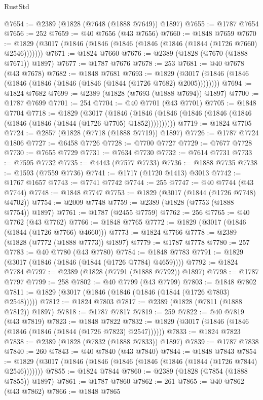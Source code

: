 \begin{lexlean}{RustStd}
\begin{coremodule}
@7654 := @2389 (@1828 (@7648 (@1888 @7649)) @1897)
@7655 := @1787 @7654
@7656 := 252
@7659 := @40 @7656 (@43 @7656)
@7660 := @1848 @7659
@7670 := @1829 (@3017 (@1846 (@1846 (@1846 (@1846 (@1846 (@1844 (@1726 @7660) @2546)))))))
@7671 := @1824 @7660
@7676 := @2389 (@1828 (@7670 (@1888 @7671)) @1897)
@7677 := @1787 @7676
@7678 := 253
@7681 := @40 @7678 (@43 @7678)
@7682 := @1848 @7681
@7693 := @1829 (@3017 (@1846 (@1846 (@1846 (@1846 (@1846 (@1846 (@1844 (@1726 @7682) @2005))))))))
@7694 := @1824 @7682
@7699 := @2389 (@1828 (@7693 (@1888 @7694)) @1897)
@7700 := @1787 @7699
@7701 := 254
@7704 := @40 @7701 (@43 @7701)
@7705 := @1848 @7704
@7718 := @1829
    (@3017
      (@1846 (@1846 (@1846 (@1846 (@1846 (@1846 (@1846 (@1846 (@1844 (@1726 @7705) @1852))))))))))
@7719 := @1824 @7705
@7724 := @2857 (@1828 (@7718 (@1888 @7719)) @1897)
@7726 := @1787 @7724 @1806
@7727 := @6458 @7726
@7728 := @7700 @7727
@7729 := @7677 @7728
@7730 := @7655 @7729
@7731 := @7634 @7730
@7732 := @7614 @7731
@7733 := @7595 @7732
@7735 := @4443 (@7577 @7733)
@7736 := @1888 @7735
@7738 := @1593 (@7559 @7736)
@7741 := @1717 (@1720 @1413) @3013
@7742 := @1767 @1657
@7743 := @7741 @7742
@7744 := 255
@7747 := @40 @7744 (@43 @7744)
@7748 := @1848 @7747
@7753 := @1829 (@3017 (@1844 (@1726 @7748) @4702))
@7754 := @2009 @7748
@7759 := @2389 (@1828 (@7753 (@1888 @7754)) @1897)
@7761 := @1787 (@2455 @7759)
@7762 := 256
@7765 := @40 @7762 (@43 @7762)
@7766 := @1848 @7765
@7772 := @1829 (@3017 (@1846 (@1844 (@1726 @7766) @4660)))
@7773 := @1824 @7766
@7778 := @2389 (@1828 (@7772 (@1888 @7773)) @1897)
@7779 := @1787 @7778
@7780 := 257
@7783 := @40 @7780 (@43 @7780)
@7784 := @1848 @7783
@7791 := @1829 (@3017 (@1846 (@1846 (@1844 (@1726 @7784) @4659))))
@7792 := @1824 @7784
@7797 := @2389 (@1828 (@7791 (@1888 @7792)) @1897)
@7798 := @1787 @7797
@7799 := 258
@7802 := @40 @7799 (@43 @7799)
@7803 := @1848 @7802
@7811 := @1829 (@3017 (@1846 (@1846 (@1846 (@1844 (@1726 @7803) @2548)))))
@7812 := @1824 @7803
@7817 := @2389 (@1828 (@7811 (@1888 @7812)) @1897)
@7818 := @1787 @7817
@7819 := 259
@7822 := @40 @7819 (@43 @7819)
@7823 := @1848 @7822
@7832 := @1829 (@3017 (@1846 (@1846 (@1846 (@1846 (@1844 (@1726 @7823) @2547))))))
@7833 := @1824 @7823
@7838 := @2389 (@1828 (@7832 (@1888 @7833)) @1897)
@7839 := @1787 @7838
@7840 := 260
@7843 := @40 @7840 (@43 @7840)
@7844 := @1848 @7843
@7854 := @1829 (@3017 (@1846 (@1846 (@1846 (@1846 (@1846 (@1844 (@1726 @7844) @2546)))))))
@7855 := @1824 @7844
@7860 := @2389 (@1828 (@7854 (@1888 @7855)) @1897)
@7861 := @1787 @7860
@7862 := 261
@7865 := @40 @7862 (@43 @7862)
@7866 := @1848 @7865

\end{coremodule}
\end{lexlean}
